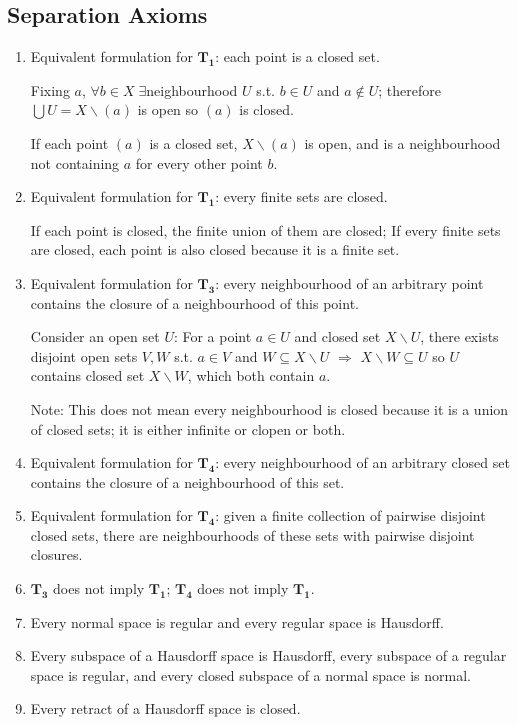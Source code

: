 \documentclass{article}
\begin{document}
\subsection{Separation Axioms}
\begin{enumerate}
\item Equivalent formulation for \(\mathbf{T_{1}}\): each point is a closed set.

Fixing \(a\), \(\forall b\in X\;\exists\)neighbourhood \(U\) s.t. \(b\in U\) and \(a\notin U\); therefore \(\bigcup U=X\backslash (a)\) is open so \((a)\) is closed.

If each point \((a)\) is a closed set, \(X\backslash (a)\) is open, and is a neighbourhood not containing \(a\) for every other point \(b\).
\item Equivalent formulation for \(\mathbf{T_{1}}\): every finite sets are closed.

If each point is closed, the finite union of them are closed; If every finite sets are closed, each point is also closed because it is a finite set.
\item Equivalent formulation for \(\mathbf{T_{3}}\): every neighbourhood of an arbitrary point contains the closure of a neighbourhood of this point.

Consider an open set \(U\): For a point \(a\in U\) and closed set \(X\backslash U\), there exists disjoint open sets \(V,W\) s.t. \(a\in V\) and \(W\subseteq X\backslash U\) \(\Longrightarrow\) \(X\backslash W\subseteq U\) 
so \(U\) contains closed set \(X\backslash W\), which both contain \(a\).

Note: This does not mean every neighbourhood is closed because it is a union of closed sets; it is either infinite or clopen or both.
\item Equivalent formulation for \(\mathbf{T_{4}}\): every neighbourhood of an arbitrary closed set contains the closure of a neighbourhood of this set.
\item Equivalent formulation for \(\mathbf{T_{4}}\): given a finite collection of pairwise disjoint closed sets, there are neighbourhoods of these sets with pairwise disjoint closures.
\item \(\mathbf{T_{3}}\) does not imply \(\mathbf{T_{1}}\); \(\mathbf{T_{4}}\) does not imply \(\mathbf{T_{1}}\).
\item Every normal space is regular and every regular space is Hausdorff.
\item Every subspace of a Hausdorff space is Hausdorff, every subspace of a regular space is regular, and every closed subspace of a normal space is normal.
\item Every retract of a Hausdorff space is closed.


\end{enumerate}
\end{document}
